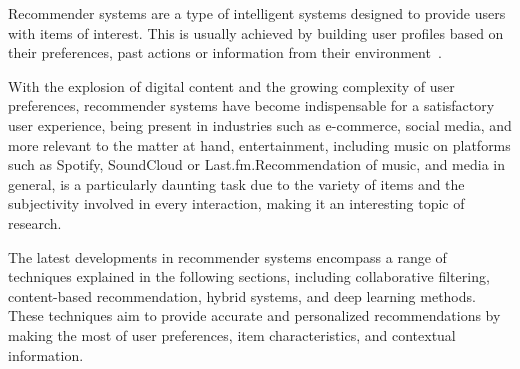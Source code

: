 Recommender systems are a type of intelligent systems designed to provide users with items of interest. This is usually achieved by building user profiles based on their preferences, past actions or information from their environment~\cite{BOOK:RS-HANDBOOK}.

With the explosion of digital content and the growing complexity of user preferences, recommender systems have become indispensable for a satisfactory user experience, being present in industries such as e-commerce, social media, and more relevant to the matter at hand, entertainment, including music on platforms such as Spotify, SoundCloud or Last.fm.\@ Recommendation of music, and media in general, is a particularly daunting task due to the variety of items and the subjectivity involved in every interaction, making it an interesting topic of research.

The latest developments in recommender systems encompass a range of techniques explained in the following sections, including collaborative filtering, content-based recommendation, hybrid systems, and deep learning methods. These techniques aim to provide accurate and personalized recommendations by making the most of user preferences, item characteristics, and contextual information.